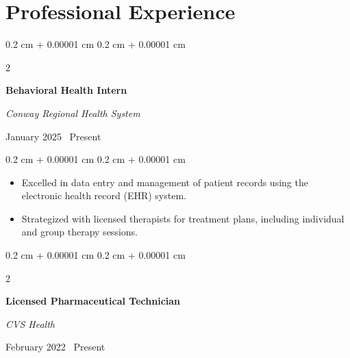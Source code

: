 \documentclass[10pt, letterpaper]{article}
\newenvironment{highlights}{
    \begin{itemize}[
        topsep=0.10 cm,
        parsep=0.10 cm,
        partopsep=0pt,
        itemsep=0pt,
        leftmargin=0.4 cm + 10pt
    ]
}{
    \end{itemize}
} %
\newenvironment{onecolentry}{
    \begin{adjustwidth}{
        0.2 cm + 0.00001 cm
    }{
        0.2 cm + 0.00001 cm
    }
}{
    \end{adjustwidth}
} %
\newenvironment{twocolentry}[2][]{
    \onecolentry
    \def\secondColumn{#2}
    \setcolumnwidth{\fill, 4.5 cm}
    \begin{paracol}{2}
}{
    \switchcolumn \raggedleft \secondColumn
    \end{paracol}
    \endonecolentry
} %
\begin{document}




\section{Professional Experience}

\begin{twocolentry}
    {
        January 2025 \textendash\ Present
    }
    \textbf{Behavioral Health Intern}

    \textit{Conway Regional Health System}
\end{twocolentry}

\vspace{0.10 cm}

\begin{onecolentry}
    \begin{highlights}
        \item Excelled in data entry and management of patient records using the electronic health record (EHR) system.
        \item Strategized with licensed therapists for treatment plans, including individual and group therapy sessions.
    \end{highlights}
\end{onecolentry}

\vspace{0.2 cm}

\begin{twocolentry}
    {
        February 2022 \textendash\ Present
    }
    \textbf{Licensed Pharmaceutical Technician}

    \textit{CVS Health}
\end{twocolentry}
\end{document}
